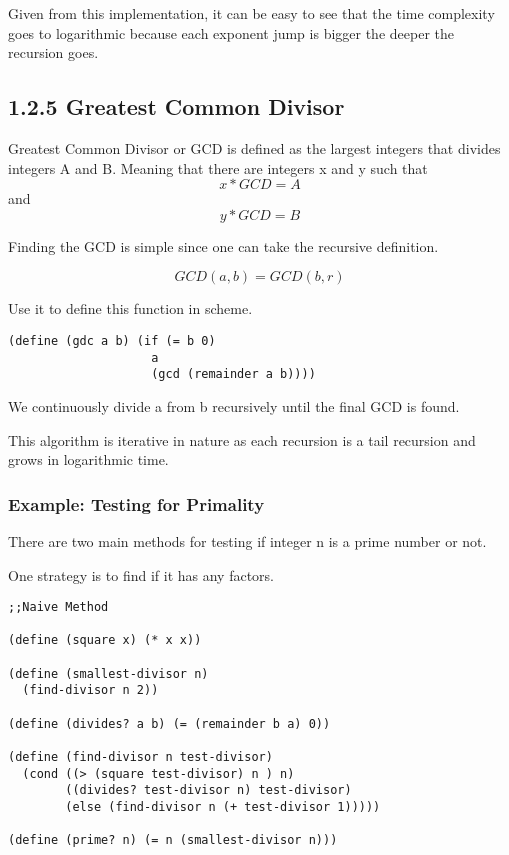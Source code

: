\documentclass[11pt]{article}
\begin{document}
Given from this implementation, it can be easy to see that the time
complexity goes to logarithmic because each exponent jump is bigger the
deeper the recursion goes.

\subsection{1.2.5 Greatest Common Divisor}
\label{sec:org0fe42aa}
Greatest Common Divisor or GCD is defined as the largest integers that
divides integers A and B. Meaning that there are integers x and y such
that \[ x *GCD =A \] and \[ y* GCD =  B \]

Finding the GCD is simple since one can take the recursive definition.



\begin{equation}
GCD(a,b) = GCD(b,r)
\end{equation}

Use it to define this function in scheme.

\begin{verbatim}
(define (gdc a b) (if (= b 0)
                    a
                    (gcd (remainder a b))))
\end{verbatim}

We continuously divide a from b recursively until the final GCD is
found.

This algorithm is iterative in nature as each recursion is a tail
recursion and grows in logarithmic time.

\subsubsection{Example: Testing for Primality}
\label{sec:orgce9b46d}
There are two main methods for testing if integer n is a prime number or
not.

One strategy is to find if it has any factors.

\begin{verbatim}
;;Naive Method

(define (square x) (* x x))

(define (smallest-divisor n)
  (find-divisor n 2))

(define (divides? a b) (= (remainder b a) 0))

(define (find-divisor n test-divisor)
  (cond ((> (square test-divisor) n ) n)
        ((divides? test-divisor n) test-divisor)
        (else (find-divisor n (+ test-divisor 1)))))

(define (prime? n) (= n (smallest-divisor n)))
\end{verbatim}
\end{document}
